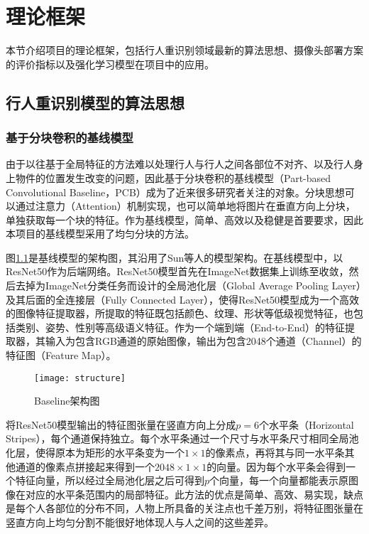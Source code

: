 \chapter{理论框架}\label{sec:theory}

本节介绍项目的理论框架，包括行人重识别领域最新的算法思想、摄像头部署方案的评价指标以及强化学习模型在项目中的应用。

\section{行人重识别模型的算法思想}

\subsection{基于分块卷积的基线模型}

由于以往基于全局特征的方法难以处理行人与行人之间各部位不对齐、以及行人身上物件的位置发生改变的问题，因此基于分块卷积的基线模型（Part-based Convolutional Baseline，PCB）成为了近来很多研究者关注的对象。分块思想可以通过注意力（Attention）机制实现，也可以简单地将图片在垂直方向上分块，单独获取每一个块的特征。作为基线模型，简单、高效以及稳健是首要要求，因此本项目的基线模型采用了均匀分块的方法。

图\ref{fig:baseline}是基线模型的架构图，其沿用了Sun等人\cite{sun2017beyond}的模型架构。在基线模型中，以ResNet50\cite{he2016deep}作为后端网络。ResNet50模型首先在ImageNet数据集上训练至收敛，然后去掉为ImageNet分类任务而设计的全局池化层（Global Average Pooling Layer）及其后面的全连接层（Fully Connected Layer），使得ResNet50模型成为一个高效的图像特征提取器，所提取的特征既包括颜色、纹理、形状等低级视觉特征，也包括类别、姿势、性别等高级语义特征。作为一个端到端（End-to-End）的特征提取器，其输入为包含RGB通道的原始图像，输出为包含2048个通道（Channel）的特征图（Feature Map）。

\begin{figure}[!htb]
\centering
\texttt{[image: structure]}
\caption{Baseline架构图}
\label{fig:baseline}
\end{figure}

将ResNet50模型输出的特征图张量在竖直方向上分成$p=6$个水平条（Horizontal Stripes），每个通道保持独立。每个水平条通过一个尺寸与水平条尺寸相同全局池化层，使得原本为矩形的水平条变为一个$1\times1$的像素点，再将其与同一水平条其他通道的像素点拼接起来得到一个$2048\times1\times1$的向量。因为每个水平条会得到一个特征向量，所以经过全局池化层之后可得到$p$个向量，每一个向量都能表示原图像在对应的水平条范围内的局部特征。此方法的优点是简单、高效、易实现，缺点是每个人各部位的分布不同，人物上所具备的关注点也千差万别，将特征图张量在竖直方向上均匀分割不能很好地体现人与人之间的这些差异。

